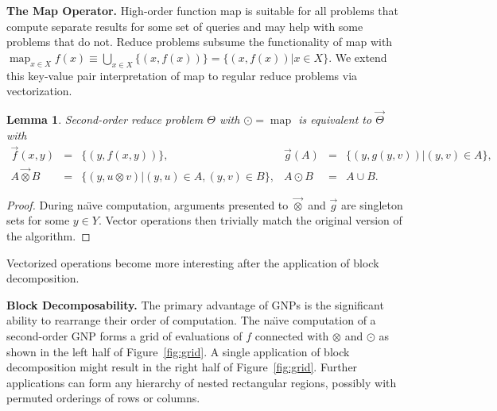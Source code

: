 \documentclass{article}
\newtheorem{lemma}{Lemma}
\newcommand{\otimesvec}{\mathbin{\overrightarrow{\otimes}}}
\DeclareMathOperator*{\map}{map}
\begin{document}

{\bf The Map Operator.}  High-order function map is suitable for all
problems that compute separate results for some set of queries and may
help with some problems that do not.  Reduce problems subsume the
functionality of map with $\map_{x \in X} f(x) \equiv \bigcup_{x \in
X} \{(x,f(x))\} = \{(x,f(x)) | x \in X\}$.  We extend this key-value
pair interpretation of map to regular reduce problems via
vectorization.
\begin{lemma}
  Second-order reduce problem $\Theta$ with $\odot = \map$ is
  equivalent to $\overrightarrow{\Theta}$ with
  \[ \begin{array}{rclrcl}
    \overrightarrow{f}(x,y) & = & \{(y, f(x,y))\}, & \overrightarrow{g}(A) & = & \{(y, g(y,v)) | (y,v) \in A\}, \\
    A \otimesvec B & = & \{(y, u \otimes v) | (y,u) \in A, (y,v) \in B\}, & A \odot B & = & A \cup B.
  \end{array} \]
\end{lemma}
\begin{proof}
  During na\"{\i}ve computation, arguments presented to $\otimesvec$
  and $\overrightarrow{g}$ are singleton sets for some $y \in Y$.
  Vector operations then trivially match the original version of the
  algorithm.
\end{proof}
\noindent Vectorized operations become more interesting after the
application of block decomposition.


{\bf Block Decomposability.} The primary advantage of GNPs is the
significant ability to rearrange their order of computation.  The
na\"{\i}ve computation of a second-order GNP forms a grid of
evaluations of $f$ connected with $\otimes$ and $\odot$ as shown in
the left half of Figure~\ref{fig:grid}.  A single application of block
decomposition might result in the right half of Figure~\ref{fig:grid}.
Further applications can form any hierarchy of nested rectangular
regions, possibly with permuted orderings of rows or columns.
\end{document}
